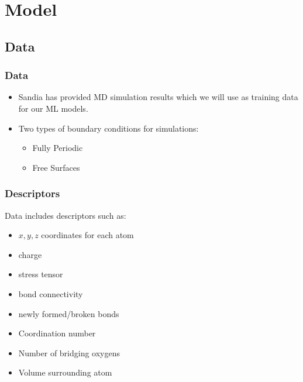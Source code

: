 \section{Model}
\subsection{Data}
\frame
{
\frametitle{Data}
\begin{block}{}
\begin{itemize}
    \item
Sandia has provided MD simulation results which we will use as training data for our ML models. 
\end{itemize}
\end{block}

\begin{block}{}
\begin{itemize}
    \item Two types of boundary conditions for simulations:
    \begin{itemize}
        \item Fully Periodic
        \item Free Surfaces
    \end{itemize}
\end{itemize}
\end{block}
}
\frame
{
\frametitle{Descriptors}
\begin{block}{}
Data includes descriptors such as:
\begin{itemize}
    \item $x, y, z$ coordinates for each atom
    \item charge
    \item stress tensor
    \item bond connectivity
    \item newly formed/broken bonds
    \item Coordination number
    \item Number of bridging oxygens
    \item Volume surrounding atom
\end{itemize}
\end{block}
}

